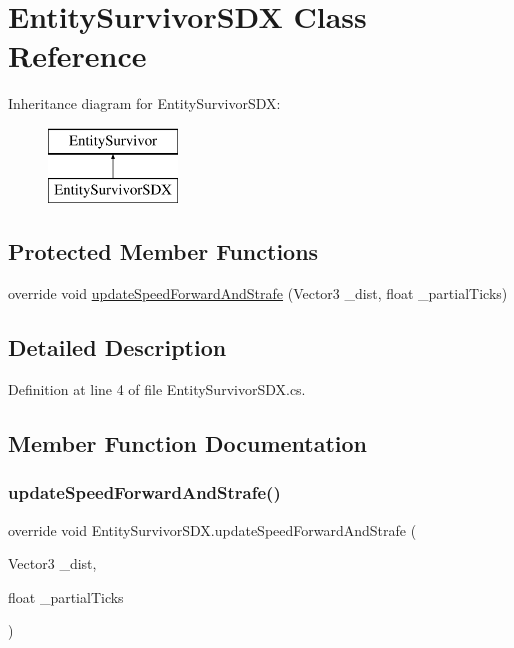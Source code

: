 \hypertarget{class_entity_survivor_s_d_x}{}\section{Entity\+Survivor\+S\+DX Class Reference}
\label{class_entity_survivor_s_d_x}
Inheritance diagram for Entity\+Survivor\+S\+DX\+:\begin{figure}[H]
\begin{center}
\leavevmode
\includegraphics[height=2.000000cm]{class_entity_survivor_s_d_x}
\end{center}
\end{figure}
\subsection*{Protected Member Functions}
\begin{DoxyCompactItemize}
\item 
override void \mbox{\hyperlink{class_entity_survivor_s_d_x_a481fbb0edef52ac83037ed017688ab6d}{update\+Speed\+Forward\+And\+Strafe}} (Vector3 \+\_\+dist, float \+\_\+partial\+Ticks)
\end{DoxyCompactItemize}


\subsection{Detailed Description}


Definition at line 4 of file Entity\+Survivor\+S\+D\+X.\+cs.



\subsection{Member Function Documentation}
\mbox{\label{class_entity_survivor_s_d_x_a481fbb0edef52ac83037ed017688ab6d}} 
\subsubsection{\texorpdfstring{updateSpeedForwardAndStrafe()}{updateSpeedForwardAndStrafe()}}
{\footnotesize\ttfamily override void Entity\+Survivor\+S\+D\+X.\+update\+Speed\+Forward\+And\+Strafe (\begin{DoxyParamCaption}\item[{Vector3}]{\+\_\+dist,  }\item[{float}]{\+\_\+partial\+Ticks }\end{DoxyParamCaption})\hspace{0.3cm}{\ttfamily [protected]}}



